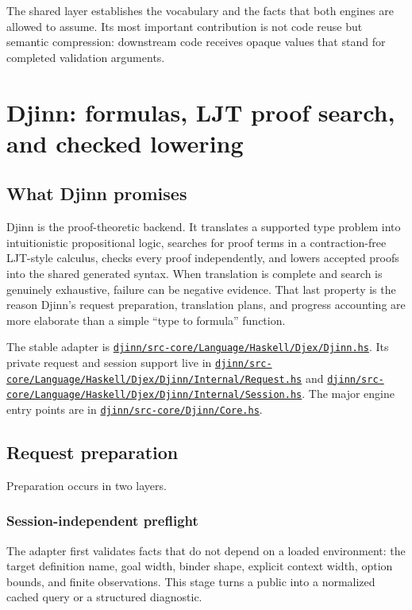 \documentclass[10pt,letterpaper,oneside]{report}
\newcommand{\code}[1]{\texttt{\detokenize{#1}}}
\def\DjexBase{https://github.com/VladimirReshetnikov/Djex/blob/e454757d53ec057238c22fc6cd0d935b7d96b3dc/}
\newcommand{\dpath}[1]{\href{\DjexBase#1}{\nolinkurl{#1}}}
\begin{document}
\begin{summarybox}
The shared layer establishes the vocabulary and the facts that both engines are allowed to assume. Its most important contribution is not code reuse but semantic compression: downstream code receives opaque values that stand for completed validation arguments.
\end{summarybox}

\chapter{Djinn: formulas, LJT proof search, and checked lowering}\label{ch:djinn}

\section{What Djinn promises}

Djinn is the proof-theoretic backend. It translates a supported type problem into intuitionistic propositional logic, searches for proof terms in a contraction-free LJT-style calculus, checks every proof independently, and lowers accepted proofs into the shared generated syntax. When translation is complete and search is genuinely exhaustive, failure can be negative evidence. That last property is the reason Djinn's request preparation, translation plans, and progress accounting are more elaborate than a simple ``type to formula'' function.

The stable adapter is \dpath{djinn/src-core/Language/Haskell/Djex/Djinn.hs}. Its private request and session support live in \dpath{djinn/src-core/Language/Haskell/Djex/Djinn/Internal/Request.hs} and \dpath{djinn/src-core/Language/Haskell/Djex/Djinn/Internal/Session.hs}. The major engine entry points are in \dpath{djinn/src-core/Djinn/Core.hs}.

\section{Request preparation}

Preparation occurs in two layers.

\subsection{Session-independent preflight}

The adapter first validates facts that do not depend on a loaded environment: the target definition name, goal width, binder shape, explicit context width, option bounds, and finite observations. This stage turns a public \code{QueryRequest} into a normalized cached query or a structured diagnostic.
\end{document}
